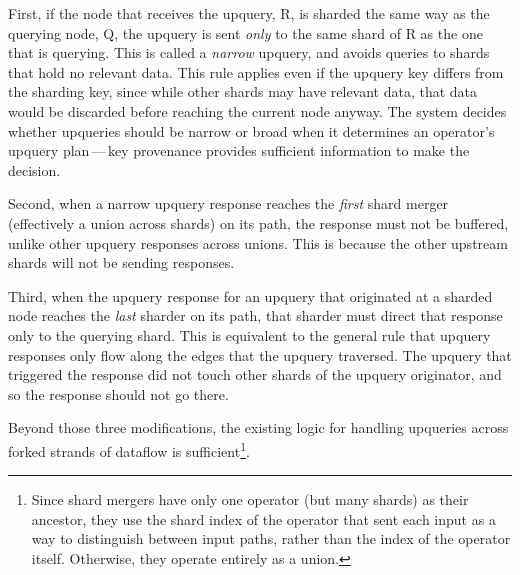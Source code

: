 First, if the node that receives the upquery, R, is sharded the same way as the
querying node, Q, the upquery is sent \emph{only} to the same shard of R as the
one that is querying. This is called a \textit{narrow} upquery, and avoids
queries to shards that hold no relevant data. This rule applies even if the
upquery key differs from the sharding key, since while other shards may have
relevant data, that data would be discarded before reaching the current node
anyway. The system decides whether upqueries should be narrow or broad when it
determines an operator's upquery plan\,---\,key provenance provides sufficient
information to make the decision.

Second, when a narrow upquery response reaches the \emph{first} shard merger
(effectively a union across shards) on its path, the response must not be
buffered, unlike other upquery responses across unions. This is because
the other upstream shards will not be sending responses.

Third, when the upquery response for an upquery that originated at a sharded
node reaches the \emph{last} sharder on its path, that sharder must direct that
response only to the querying shard. This is equivalent to the general rule that
upquery responses only flow along the edges that the upquery traversed. The
upquery that triggered the response did not touch other shards of the upquery
originator, and so the response should not go there.

Beyond those three modifications, the existing logic for handling upqueries
across forked strands of dataflow is sufficient\footnote{Since shard mergers
have only one operator (but many shards) as their ancestor, they use the shard
index of the operator that sent each input as a way to distinguish between input
paths, rather than the index of the operator itself. Otherwise, they operate
entirely as a union.}.
